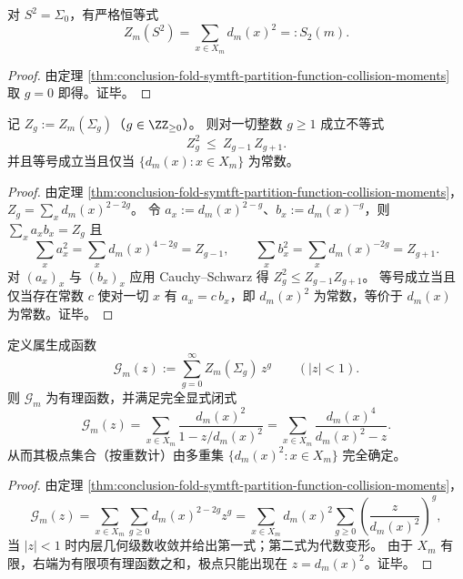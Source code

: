\begin{corollary}[球面配分函数与二次碰撞矩]\label{cor:conclusion-tqft-sphere-partition-function-s2}
对 \(S^2=\Sigma_0\)，有严格恒等式
\[
Z_m(S^2)=\sum_{x\in X_m}d_m(x)^2=:S_2(m).
\]
\end{corollary}
\begin{proof}
由定理 \ref{thm:conclusion-fold-symtft-partition-function-collision-moments} 取 \(g=0\) 即得。证毕。
\end{proof}

\begin{proposition}[属配分函数的离散对数凸性]\label{prop:conclusion-tqft-genus-logconvexity}
记 \(Z_g:=Z_m(\Sigma_g)\)（\(g\in\ZZ_{\ge 0}\)）。
则对一切整数 \(g\ge 1\) 成立不等式
\[
Z_g^2\ \le\ Z_{g-1}\,Z_{g+1}.
\]
并且等号成立当且仅当 \(\{d_m(x):x\in X_m\}\) 为常数。
\end{proposition}
\begin{proof}
由定理 \ref{thm:conclusion-fold-symtft-partition-function-collision-moments}，
\(
Z_g=\sum_x d_m(x)^{2-2g}
\)。
令 \(a_x:=d_m(x)^{2-g}\)、\(b_x:=d_m(x)^{-g}\)，则 \(\sum_x a_xb_x=Z_g\) 且
\[
\sum_x a_x^2=\sum_x d_m(x)^{4-2g}=Z_{g-1},\qquad
\sum_x b_x^2=\sum_x d_m(x)^{-2g}=Z_{g+1}.
\]
对 \((a_x)_x\) 与 \((b_x)_x\) 应用 Cauchy--Schwarz 得 \(Z_g^2\le Z_{g-1}Z_{g+1}\)。
等号成立当且仅当存在常数 \(c\) 使对一切 \(x\) 有 \(a_x=c\,b_x\)，即 \(d_m(x)^2\) 为常数，等价于 \(d_m(x)\) 为常数。证毕。
\end{proof}

\begin{proposition}[属生成函数的有理性与极点谱]\label{prop:conclusion-tqft-genus-generating-function-rational}
定义属生成函数
\[
\mathcal{G}_m(z):=\sum_{g=0}^{\infty}Z_m(\Sigma_g)\,z^g\qquad(|z|<1).
\]
则 \(\mathcal{G}_m\) 为有理函数，并满足完全显式闭式
\[
\mathcal{G}_m(z)
=\sum_{x\in X_m}\frac{d_m(x)^2}{1-z/d_m(x)^2}
=\sum_{x\in X_m}\frac{d_m(x)^4}{d_m(x)^2-z}.
\]
从而其极点集合（按重数计）由多重集 \(\{d_m(x)^2:x\in X_m\}\) 完全确定。
\end{proposition}
\begin{proof}
由定理 \ref{thm:conclusion-fold-symtft-partition-function-collision-moments}，
\[
\mathcal{G}_m(z)
=\sum_{x\in X_m}\sum_{g\ge 0} d_m(x)^{2-2g}z^g
=\sum_{x\in X_m}d_m(x)^2\sum_{g\ge 0}\left(\frac{z}{d_m(x)^2}\right)^g,
\]
当 \(|z|<1\) 时内层几何级数收敛并给出第一式；第二式为代数变形。
由于 \(X_m\) 有限，右端为有限项有理函数之和，极点只能出现在 \(z=d_m(x)^2\)。证毕。
\end{proof}


